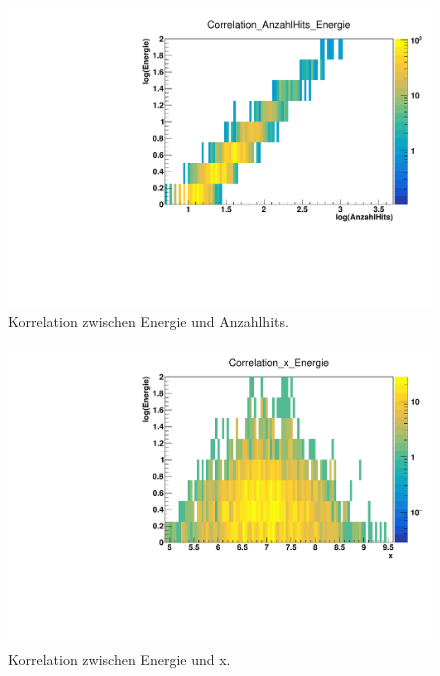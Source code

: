 \begin{figure}[H]
  \centering
  \includegraphics[height=0.4\textheight]{Bilder/CorHits.pdf}
  \caption{Korrelation zwischen Energie und Anzahlhits.}
  \label{fig:CorHits}
\end{figure}

\begin{figure}[H]
  \centering
  \includegraphics[height=0.4\textheight]{Bilder/CorX.pdf}
  \caption{Korrelation zwischen Energie und x.}
  \label{fig:CorX}
\end{figure}


